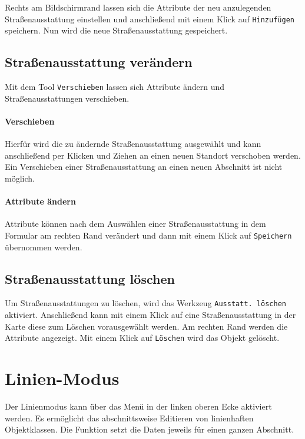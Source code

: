 \documentclass[a4paper,11pt,bibliography=totoc, listof=totoc,titlepage]{scrartcl}
\begin{document}
Rechts am Bildschirmrand lassen sich die Attribute der neu anzulegenden Straßenausstattung einstellen und anschließend mit einem Klick auf \verb|Hinzufügen| speichern. Nun wird die neue Straßenausstattung gespeichert.

\subsection{Straßenausstattung verändern}
Mit dem Tool \verb|Verschieben| lassen sich Attribute ändern und Straßenausstattungen verschieben. 

\paragraph{Verschieben} 
Hierfür wird die zu ändernde Straßenausstattung ausgewählt und kann anschließend per Klicken und Ziehen an einen neuen Standort verschoben werden. Ein Verschieben einer Straßenausstattung an einen neuen Abschnitt ist nicht möglich.

\paragraph{Attribute ändern}
Attribute können nach dem Auswählen einer Straßenausstattung in dem Formular am rechten Rand verändert und dann mit einem Klick auf \verb|Speichern| übernommen werden.

\subsection{Straßenausstattung löschen}
Um Straßenausstattungen zu löschen, wird das Werkzeug \verb|Ausstatt. löschen| aktiviert. Anschließend kann mit einem Klick auf eine Straßenausstattung in der Karte diese zum Löschen vorausgewählt werden. Am rechten Rand werden die Attribute angezeigt. Mit einem Klick auf \verb|Löschen| wird das Objekt gelöscht.

\section{Linien-Modus}
Der Linienmodus kann über das Menü in der linken oberen Ecke aktiviert werden. Es ermöglicht das abschnittsweise Editieren von linienhaften Objektklassen. Die Funktion setzt die Daten jeweils für einen ganzen Abschnitt.
\end{document}
